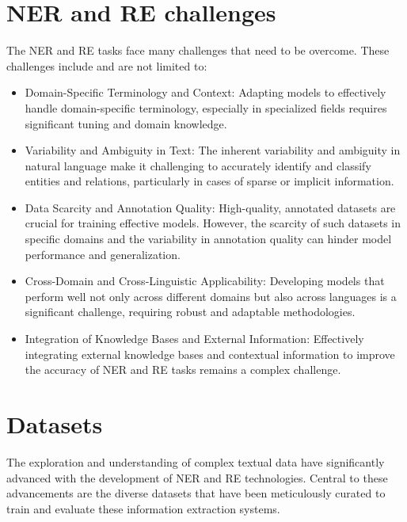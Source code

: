 \section{NER and RE challenges}
\label{sec:nerrechallenges}
The NER and RE tasks face many challenges that need to be overcome. These challenges include and are not limited to:
\begin{itemize}
\item Domain-Specific Terminology and Context\cite{fang-etal-2021-tebner}: Adapting models to effectively handle domain-specific terminology, especially in specialized fields requires significant tuning and domain knowledge.

\item Variability and Ambiguity in Text\cite{8520330}: The inherent variability and ambiguity in natural language make it challenging to accurately identify and classify entities and relations, particularly in cases of sparse or implicit information.

\item Data Scarcity and Annotation Quality: High-quality, annotated datasets are crucial for training effective models. However, the scarcity of such datasets in specific domains and the variability in annotation quality can hinder model performance and generalization.

\item Cross-Domain and Cross-Linguistic Applicability: Developing models that perform well not only across different domains but also across languages is a significant challenge\cite{tsai-etal-2016-cross}, requiring robust and adaptable methodologies.

\item Integration of Knowledge Bases and External Information: Effectively integrating external knowledge bases and contextual information to improve the accuracy of NER and RE tasks remains a complex challenge\cite{le2018improving}.
\end{itemize}

\section{Datasets}
\label{sec:datasets}
The exploration and understanding of complex textual data have significantly advanced with the development of NER and RE technologies. Central to these advancements are the diverse datasets that have been meticulously curated to train and evaluate these information extraction systems.

